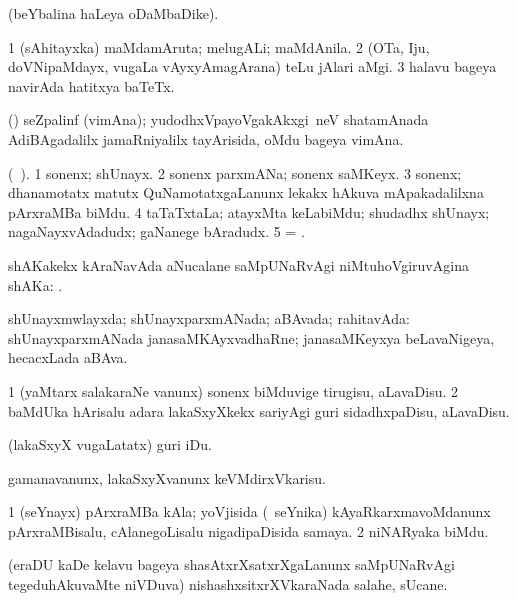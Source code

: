 \bentry
{}
\gl{\saMkiSx} 
\bmng
{} (beYbalina haLeya oDaMbaDike).
\emng
\eentry

\bentry
{} 
\gl{\nA} 
\bmng
\bnum
\num{1} (sAhitayxka) maMdamAruta; melugALi; maMdAnila. 
\num{2} (OTa, Iju, doVNipaMdayx, \mo vugaLa vAyxyAmagArana) teLu jAlari aMgi. 
\num{3} halavu bageya navirAda hatitxya baTeTx.
\enum
\emng
\eentry

\bentry
{} 
\gl{\nA} (\ca) 
\bmng
seZpalinf (vimAna); yudodhxVpayoVgakAkxgi \,neV shatamAnada AdiBAgadalilx jamaRniyalilx  tayArisida, oMdu bageya vimAna.
\emng
\eentry

\bentry
{} 
\gl{\nA} 
\bmng
(\bava\ ). 
\bnum
\num{1} sonenx; shUnayx. 
\num{2} sonenx parxmANa; sonenx saMKeyx. 
\num{3} sonenx; dhanamotatx matutx QuNamotatxgaLanunx lekakx hAkuva mApakadalilxna pArxraMBa biMdu. 
\num{4} taTaTxtaLa; atayxMta keLabiMdu; shudadhx shUnayx; nagaNayxvAdadudx; gaNanege bAradudx. 
\num{5} = .
\enum
\emng

\noindent                                              
\gl{\pagu}  
\bmng
{} shAKakekx kAraNavAda aNucalane saMpUNaRvAgi niMtuhoVgiruvAgina  shAKa: .
\emng
\eentry

\bentry
{} 
\gl{\gu} 
\bmng
shUnayxmwlayxda; shUnayxparxmANada;  aBAvada;  rahitavAda:  shUnayxparxmANada janasaMKAyxvadhaRne; janasaMKeyxya beLavaNigeya, hecacxLada aBAva.
\emng
\eentry

\bentry
{} 
\gl{\sakirx} 
\bmng
\bnum
\num{1} (yaMtarx salakaraNe \mo vanunx) sonenx biMduvige tirugisu, aLavaDisu. 
\num{2} baMdUka hArisalu adara lakaSxyXkekx sariyAgi guri sidadhxpaDisu, aLavaDisu.
\enum
\emng

\noindent
\gl{\pagu} 
\bmng
\banum
{} (lakaSxyX \mo vugaLatatx) guri iDu. 

 gamanavanunx,  lakaSxyXvanunx  keVMdirxVkarisu.
\eanum
\emng
\eentry

\bentry
{} 
\gl{\nA} 
\bmng
\bnum
\num{1} (seYnayx) pArxraMBa kAla; yoVjisida (\kanmu\ seYnika) kAyaRkarxmavoMdanunx pArxraMBisalu, cAlanegoLisalu nigadipaDisida samaya. 
\num{2} niNARyaka biMdu.
\enum
\emng
\eentry

\bentry
{}  
\gl{\nA} 
\bmng
(eraDU kaDe kelavu bageya shasAtxrXsatxrXgaLanunx saMpUNaRvAgi tegeduhAkuvaMte niVDuva) nishashxsitxrXVkaraNada salahe, sUcane.
\emng
\eentry

